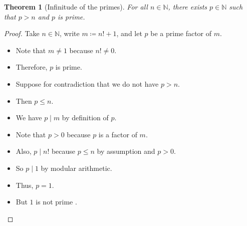 \documentclass[12pt]{article}
\newtheorem*{theorem}{Theorem}
\newcommand{\N}{\mathbb{N}}
\begin{document}
\begin{theorem}[Infinitude of the primes]
  For all $n \in \N$,
  there exists $p \in \N$ such that
  $p > n$ and $p$ is prime.
\end{theorem}

\begin{proof}
  Take $n \in \N$, write $m \coloneqq n! + 1$,
  and let $p$ be a prime factor of $m$.
  \begin{itemize}
    \item Note that $m \neq 1$ because $n! \neq 0$.
    \item Therefore, $p$ is prime.
    \item Suppose for contradiction that we do not have $p > n$.
    \item Then $p \leq n$.
    \item We have $p \mid m$ by definition of $p$.
    \item Note that $p > 0$ because $p$ is a factor of $m$.
    \item Also, $p \mid n!$ because $p \leq n$ by assumption and $p > 0$.
    \item So $p \mid 1$ by modular arithmetic.
    \item Thus, $p = 1$.
    \item But $1$ is not prime \textreferencemark.
      \qedhere
  \end{itemize}
\end{proof}
\end{document}
